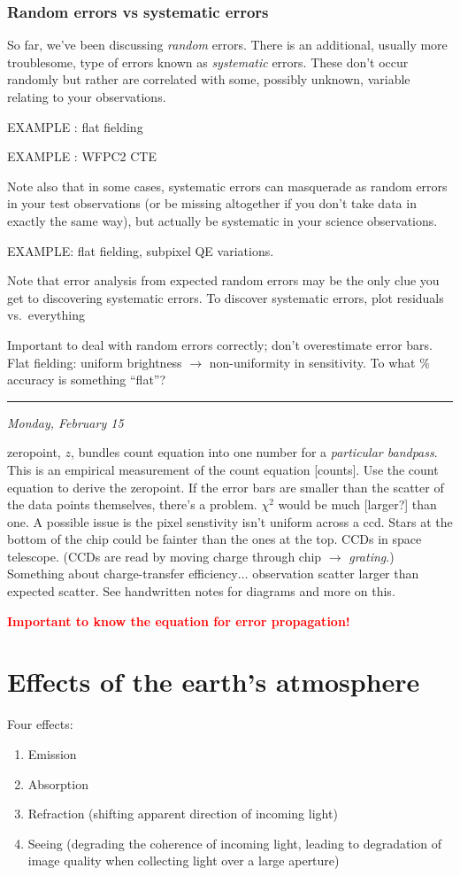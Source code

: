 \documentclass[12pt]{article}
\newcommand{\mynotes}[1]{\textcolor{myBlue}{#1}}
\newcommand{\mydate}[1]{
    \begin{flushright}
        \rule{\textwidth}{0.4pt} %
        \footnotesize\hfill\textit{#1}
    \end{flushright}}
\begin{document}
\subsubsection{Random errors vs systematic errors}
So far, we've been discussing \textit{random} errors.
There is an additional,
usually more troublesome, type of errors known as \textit{systematic} errors.
These don't occur randomly but rather are correlated with some,
possibly unknown, variable relating to your observations.

EXAMPLE : flat fielding

EXAMPLE : WFPC2 CTE

Note also that in some cases, systematic errors can masquerade as
random errors in your test observations (or be missing altogether if
you don't take data in exactly the same way), but actually be
systematic in your science observations.

EXAMPLE: flat fielding, subpixel QE variations.

Note that error analysis from expected random errors may be the only
clue you get to discovering systematic errors. To discover systematic
errors, plot residuals vs.\ everything


\mynotes{Important to deal with random errors correctly;
    don't overestimate error bars.
    Flat fielding: uniform brightness $\rightarrow$ non-uniformity in
    sensitivity. To what \% accuracy is something ``flat''?
}

\mydate{Monday, February 15}

\textcolor{myBlue}{zeropoint, $z$, bundles count equation into one number for a
\emph{particular bandpass}. This is an empirical measurement of the count
equation [counts]. Use the count equation to derive the zeropoint. If the error
bars are smaller than the scatter of the data points themselves, there's a
problem. $\chi^{2}$ would be much [larger?] than one. A possible issue is the
pixel senstivity isn't uniform across a ccd. Stars at the bottom of the chip
could be fainter than the ones at the top. CCDs in space telescope. (CCDs are
read by moving charge through chip $\rightarrow$ \emph{grating}.) Something
about charge-transfer efficiency$\ldots$ observation scatter larger than
expected scatter. See handwritten notes for diagrams and more on this. }

\textcolor{red}{\textbf{Important to know the equation for error
propagation!} }

\newpage
\section{Effects of the earth's atmosphere}
Four effects:
\begin{enumerate}
    \item Emission
    \item Absorption
    \item Refraction (shifting apparent direction of incoming light)
    \item Seeing (degrading the coherence of incoming light,
        leading to degradation of image quality when collecting light
        over a large aperture)
\end{enumerate}
\end{document}
